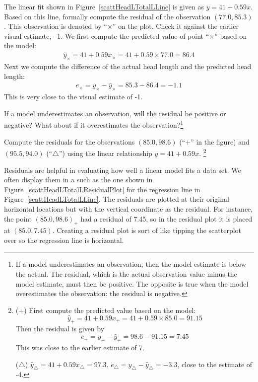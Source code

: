 \begin{example}{The linear fit shown in Figure~\ref{scattHeadLTotalLLine} is given as $\hat{y} = 41 + 0.59x$. Based on this line, formally compute the residual of the observation $(77.0, 85.3)$. This observation is denoted by ``$\times$'' on the plot. Check it against the earlier visual estimate,~-1.}
We first compute the predicted value of point ``$\times$'' based on the model:
\begin{eqnarray*}
\hat{y}_{\times} = 41+0.59x_{\times} = 41+0.59\times 77.0 = 86.4
\end{eqnarray*}
Next we compute the difference of the actual head length and the predicted head length:
\begin{eqnarray*}
e_{\times} = y_{\times} - \hat{y}_{\times} = 85.3 -  86.4 = -1.1
\end{eqnarray*}
This is very close to the visual estimate of -1.
\end{example}

\begin{exercise}
If a model underestimates an observation, will the residual be positive or negative? What about if it overestimates the observation?\footnote{If a model underestimates an observation, then the model estimate is below the actual. The residual, which is the actual observation value minus the model estimate, must then be positive. The opposite is true when the model overestimates the observation: the residual is negative.}
\end{exercise}

\begin{exercise}
Compute the residuals for the observations $(85.0, 98.6)$ (``$+$'' in the figure) and $(95.5, 94.0)$ (``$\triangle$'') using the linear relationship $\hat{y} = 41 + 0.59x$. \footnote{($+$) First compute the predicted value based on the model: $$\hat{y}_{+} = 41+0.59x_{+} = 41+0.59\times 85.0 = 91.15$$ Then the residual is given by $$e_{+} = y_{+} - \hat{y}_{+} = 98.6-91.15=7.45$$This was close to the earlier estimate of 7.

($\triangle$) $\hat{y}_{\triangle} = 41+0.59x_{\triangle} = 97.3$. $e_{\triangle} = y_{\triangle} - \hat{y}_{\triangle} = -3.3$, close to the estimate of -4.}
\end{exercise}

Residuals are helpful in evaluating how well a linear model fits a data set. We often display them in a  such as the one shown in Figure~\ref{scattHeadLTotalLResidualPlot} for the regression line in Figure~\ref{scattHeadLTotalLLine}. The residuals are plotted at their original horizontal locations but with the vertical coordinate as the residual. For instance, the point $(85.0,98.6)_{+}$ had a residual of 7.45, so in the residual plot it is placed at $(85.0, 7.45)$. Creating a residual plot is sort of like tipping the scatterplot over so the regression line is horizontal. 

